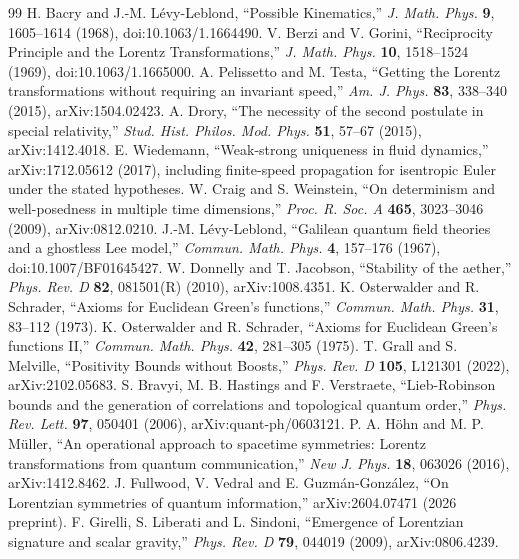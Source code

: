\documentclass[11pt,a4paper]{article}
\begin{document}
\begin{thebibliography}{99}
 H. Bacry and J.-M. L\'evy-Leblond, ``Possible Kinematics,'' \emph{J. Math. Phys.} \textbf{9}, 1605--1614 (1968), doi:10.1063/1.1664490.
 V. Berzi and V. Gorini, ``Reciprocity Principle and the Lorentz Transformations,'' \emph{J. Math. Phys.} \textbf{10}, 1518--1524 (1969), doi:10.1063/1.1665000.
 A. Pelissetto and M. Testa, ``Getting the Lorentz transformations without requiring an invariant speed,'' \emph{Am. J. Phys.} \textbf{83}, 338--340 (2015), arXiv:1504.02423.
 A. Drory, ``The necessity of the second postulate in special relativity,'' \emph{Stud. Hist. Philos. Mod. Phys.} \textbf{51}, 57--67 (2015), arXiv:1412.4018.
 E. Wiedemann, ``Weak-strong uniqueness in fluid dynamics,'' arXiv:1712.05612 (2017), including finite-speed propagation for isentropic Euler under the stated hypotheses.
 W. Craig and S. Weinstein, ``On determinism and well-posedness in multiple time dimensions,'' \emph{Proc. R. Soc. A} \textbf{465}, 3023--3046 (2009), arXiv:0812.0210.
 J.-M. L\'evy-Leblond, ``Galilean quantum field theories and a ghostless Lee model,'' \emph{Commun. Math. Phys.} \textbf{4}, 157--176 (1967), doi:10.1007/BF01645427.
 W. Donnelly and T. Jacobson, ``Stability of the aether,'' \emph{Phys. Rev. D} \textbf{82}, 081501(R) (2010), arXiv:1008.4351.
 K. Osterwalder and R. Schrader, ``Axioms for Euclidean Green's functions,'' \emph{Commun. Math. Phys.} \textbf{31}, 83--112 (1973).
 K. Osterwalder and R. Schrader, ``Axioms for Euclidean Green's functions II,'' \emph{Commun. Math. Phys.} \textbf{42}, 281--305 (1975).
 T. Grall and S. Melville, ``Positivity Bounds without Boosts,'' \emph{Phys. Rev. D} \textbf{105}, L121301 (2022), arXiv:2102.05683.
 S. Bravyi, M. B. Hastings and F. Verstraete, ``Lieb-Robinson bounds and the generation of correlations and topological quantum order,'' \emph{Phys. Rev. Lett.} \textbf{97}, 050401 (2006), arXiv:quant-ph/0603121.
 P. A. H\"ohn and M. P. M\"uller, ``An operational approach to spacetime symmetries: Lorentz transformations from quantum communication,'' \emph{New J. Phys.} \textbf{18}, 063026 (2016), arXiv:1412.8462.
 J. Fullwood, V. Vedral and E. Guzm\'an-Gonz\'alez, ``On Lorentzian symmetries of quantum information,'' arXiv:2604.07471 (2026 preprint).
 F. Girelli, S. Liberati and L. Sindoni, ``Emergence of Lorentzian signature and scalar gravity,'' \emph{Phys. Rev. D} \textbf{79}, 044019 (2009), arXiv:0806.4239.

\end{thebibliography}
\end{document}

